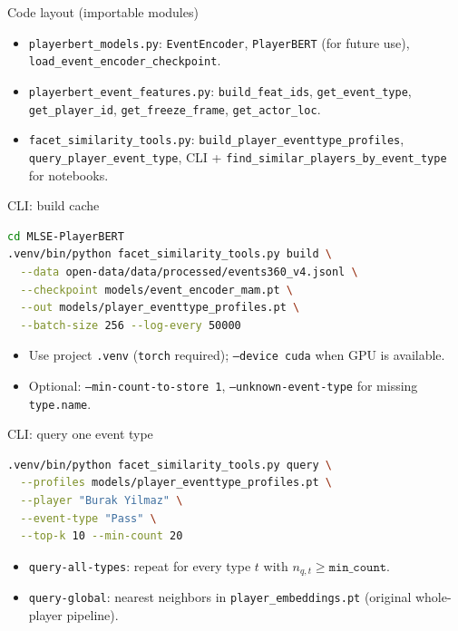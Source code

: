 \documentclass[aspectratio=169]{beamer}
\begin{document}
\begin{frame}{Code layout (importable modules)}
  \begin{itemize}
    \item \texttt{playerbert\_models.py}: \texttt{EventEncoder}, \texttt{PlayerBERT} (for future use), \texttt{load\_event\_encoder\_checkpoint}.
    \item \texttt{playerbert\_event\_features.py}: \texttt{build\_feat\_ids}, \texttt{get\_event\_type}, \texttt{get\_player\_id}, \texttt{get\_freeze\_frame}, \texttt{get\_actor\_loc}.
    \item \texttt{facet\_similarity\_tools.py}: \texttt{build\_player\_eventtype\_profiles}, \texttt{query\_player\_event\_type}, CLI + \texttt{find\_similar\_players\_by\_event\_type} for notebooks.
  \end{itemize}
\end{frame}

\begin{frame}[fragile]{CLI: build cache}
\begin{lstlisting}[language=bash]
cd MLSE-PlayerBERT
.venv/bin/python facet_similarity_tools.py build \
  --data open-data/data/processed/events360_v4.jsonl \
  --checkpoint models/event_encoder_mam.pt \
  --out models/player_eventtype_profiles.pt \
  --batch-size 256 --log-every 50000
\end{lstlisting}
\begin{itemize}
  \item Use project \texttt{.venv} (\texttt{torch} required); \texttt{--device cuda} when GPU is available.
  \item Optional: \texttt{--min-count-to-store 1}, \texttt{--unknown-event-type} for missing \texttt{type.name}.
\end{itemize}
\end{frame}

\begin{frame}[fragile]{CLI: query one event type}
\begin{lstlisting}[language=bash]
.venv/bin/python facet_similarity_tools.py query \
  --profiles models/player_eventtype_profiles.pt \
  --player "Burak Yilmaz" \
  --event-type "Pass" \
  --top-k 10 --min-count 20
\end{lstlisting}
\begin{itemize}
  \item \texttt{query-all-types}: repeat for every type $t$ with $n_{q,t} \geq \texttt{min\_count}$.
  \item \texttt{query-global}: nearest neighbors in \texttt{player\_embeddings.pt} (original whole-player pipeline).
\end{itemize}
\end{frame}
\end{document}
